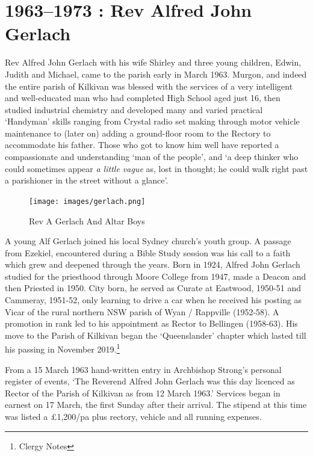 \printendnotes
\setcounter{endnote}{0}
\chapter{1963--1973 : Rev Alfred John
Gerlach}

Rev Alfred John Gerlach with his wife Shirley and three young children,
Edwin, Judith and Michael, came to the parish early in March 1963.
Murgon, and indeed the entire parish of Kilkivan was blessed with the
services of a very intelligent and well-educated man who had completed
High School aged just 16, then studied industrial chemistry and
developed many and varied practical `Handyman' skills ranging from
Crystal radio set making through motor vehicle maintenance to (later on)
adding a ground-floor room to the Rectory to accommodate his father.
Those who got to know him well have reported a compassionate and
understanding `man of the people', and `a deep thinker who could
sometimes appear \emph{a little vague} as, lost in thought; he could
walk right past a parishioner in the street without a glance'.




\begin{figure}[!h]
\begin{center}
\texttt{[image: images/gerlach.png]}
\caption{Rev A Gerlach And Altar Boys}
\end{center}
\end{figure}


A young Alf Gerlach joined his local Sydney church's youth group. A
passage from Ezekiel, encountered during a Bible Study session was his
call to a faith which grew and deepened through the years. Born in 1924,
Alfred John Gerlach studied for the priesthood through Moore College
from 1947, made a Deacon and then Priested in 1950. City born, he served
as Curate at Eastwood, 1950-51 and Cammeray, 1951-52, only learning to
drive a car when he received his posting as Vicar of the rural northern
NSW parish of Wyan / Rappville (1952-58). A promotion in rank led to his
appointment as Rector to Bellingen (1958-63). His move to the Parish of
Kilkivan began the `Queenslander' chapter which lasted till his passing
in November 2019.\footnote{Clergy Notes}

From a 15 March 1963 hand-written entry in Archbishop Strong's personal
register of events, `The Reverend Alfred John Gerlach was this day
licenced as Rector of the Parish of Kilkivan as from 12 March 1963.'
Services began in earnest on 17 March, the first Sunday after their
arrival. The stipend at this time was listed a \pounds1,200/pa plus rectory,
vehicle and all running expenses.

